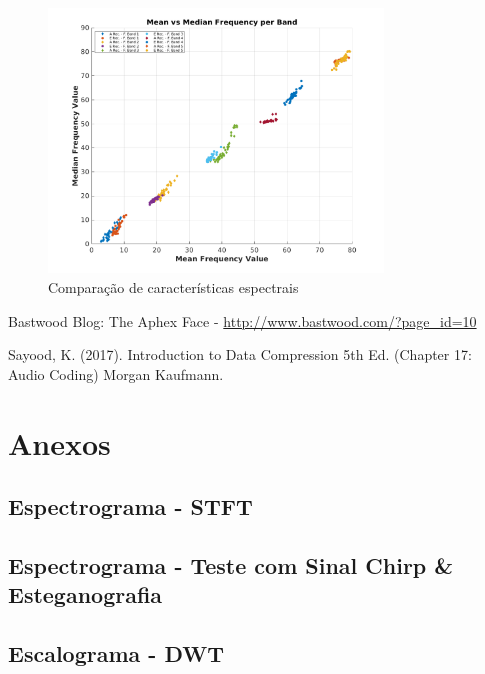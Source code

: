 \documentclass{article}
\begin{document}
\begin{figure}[H]
	\begin{center}
		\includegraphics[width=3.5in]{Figures/mf_mf.png}
		\caption{Comparação de características espectrais}
		\label{fig:ff}
	\end{center}
\end{figure}

\begin{thebibliography}{1}

Bastwood Blog: The Aphex Face - \url{http://www.bastwood.com/?page_id=10}

Sayood, K. (2017). Introduction to Data Compression 5th Ed. (Chapter 17: Audio Coding) Morgan Kaufmann.


\end{thebibliography}

\onecolumn
\section*{Anexos}
\subsection*{Espectrograma - STFT}

\subsection*{Espectrograma - Teste com Sinal Chirp \& Esteganografia}


\subsection*{Escalograma - DWT}

\end{document}
